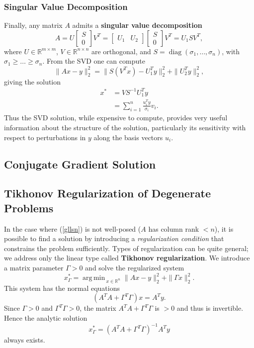 \documentclass[reqno]{amsart}
\DeclareMathOperator*{\argmin}{arg\,min\,}
\numberwithin{equation}{section}
\begin{document}
\subsubsection{Singular Value Decomposition}
Finally, any matrix $A$ admits a \textbf{singular value decomposition}
$$
    A = U \begin{bmatrix} S \\ 0 \end{bmatrix} V^T =
        \begin{bmatrix} U_1 & U_2 \end{bmatrix} \begin{bmatrix} S \\ 0 \end{bmatrix} V^T
        = U_1 S V^T,
$$
where $U \in \mathbb R^{m \times m}$, $V \in \mathbb R^{n \times n}$ are orthogonal,
and $S = \operatorname{diag}(\sigma_1, \ldots, \sigma_n)$, with
$\sigma_1 \ge \ldots \ge \sigma_n$. From the SVD one can compute
$$
    \|Ax - y\|_2^2 = \| S(V^Tx) - U_1^Ty\|_2^2 + \|U_2^Ty\|_2^2,
$$
giving the solution
\begin{align*}
    x^* &= VS^{-1} U_1^Ty \\
        &= \sum_{i=1}^n \frac{u_i^Ty}{\sigma_i} v_i.
\end{align*}
Thus the SVD solution, while expensive to compute, provides very useful information about
the structure of the solution, particularly its
sensitivity with respect to perturbations in $y$ along the basis vectors
$u_i$.

\subsection{Conjugate Gradient Solution}
\subsection{Tikhonov Regularization of Degenerate Problems}
In the case where (\ref{gllsn}) is not well-posed ($A$ has column rank $<n$), it is possible
to find a solution by introducing a \emph{regularization condition} that constrains the
problem sufficiently. Types of regularization can be quite general; we address only the linear
type called \textbf{Tikhonov regularization}.
We introduce a matrix parameter $\Gamma > 0$ and solve the regularized system
\begin{equation}
    x_{\Gamma}^* = \argmin_{x \in \mathbb R^n} \|Ax - y\|_2^2 + \|\Gamma x\|_2^2.
\label{glls-reg}
\end{equation}
This system has the normal equations
\begin{equation}
    (A^TA + \Gamma^T\Gamma) x = A^Ty.
\label{normal-reg}
\end{equation}
Since $\Gamma > 0$ and $\Gamma^T\Gamma > 0$, the matrix $A^TA + \Gamma^T\Gamma$ is $> 0$ and thus
is invertible. Hence the analytic solution
$$
    x^*_{\Gamma} = (A^TA + \Gamma^T\Gamma)^{-1}A^Ty
$$
always exists.
\end{document}
